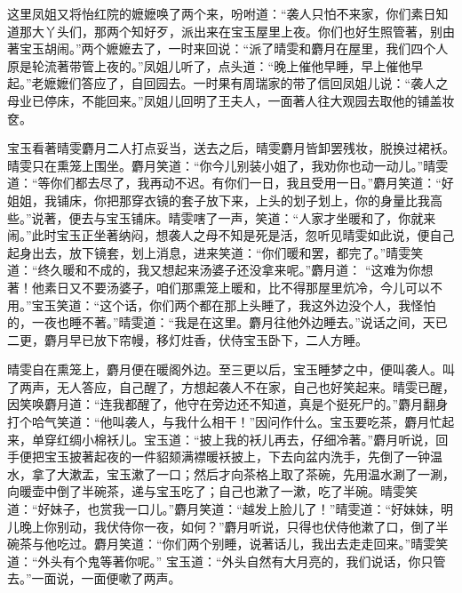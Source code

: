 \begin{parag}
    这里凤姐又将怡红院的嬷嬷唤了两个来，吩咐道：“袭人只怕不来家，你们素日知道那大丫头们，那两个知好歹，派出来在宝玉屋里上夜。你们也好生照管著，别由著宝玉胡闹。”两个嬷嬷去了，一时来回说：“派了晴雯和麝月在屋里，我们四个人原是轮流著带管上夜的。”凤姐儿听了，点头道：“晚上催他早睡，早上催他早起。”老嬷嬷们答应了，自回园去。一时果有周瑞家的带了信回凤姐儿说：“袭人之母业已停床，不能回来。”凤姐儿回明了王夫人，一面著人往大观园去取他的铺盖妆奁。
\end{parag}


\begin{parag}
    宝玉看著晴雯麝月二人打点妥当，送去之后，晴雯麝月皆卸罢残妆，脱换过裙袄。晴雯只在熏笼上围坐。麝月笑道：“你今儿别装小姐了，我劝你也动一动儿。”晴雯道：“等你们都去尽了，我再动不迟。有你们一日，我且受用一日。”麝月笑道：“好姐姐，我铺床，你把那穿衣镜的套子放下来，上头的划子划上，你的身量比我高些。”说著，便去与宝玉铺床。晴雯嗐了一声，笑道：“人家才坐暖和了，你就来闹。”此时宝玉正坐著纳闷，想袭人之母不知是死是活，忽听见晴雯如此说，便自己起身出去，放下镜套，划上消息，进来笑道：“你们暖和罢，都完了。”晴雯笑道：“终久暖和不成的，我又想起来汤婆子还没拿来呢。”麝月道： “这难为你想著！他素日又不要汤婆子，咱们那熏笼上暖和，比不得那屋里炕冷，今儿可以不用。”宝玉笑道：“这个话，你们两个都在那上头睡了，我这外边没个人，我怪怕的，一夜也睡不著。”晴雯道：“我是在这里。麝月往他外边睡去。”说话之间，天已二更，麝月早已放下帘幔，移灯炷香，伏侍宝玉卧下，二人方睡。
\end{parag}


\begin{parag}
    晴雯自在熏笼上，麝月便在暖阁外边。至三更以后，宝玉睡梦之中，便叫袭人。叫了两声，无人答应，自己醒了，方想起袭人不在家，自己也好笑起来。晴雯已醒，因笑唤麝月道：“连我都醒了，他守在旁边还不知道，真是个挺死尸的。”麝月翻身打个哈气笑道：“他叫袭人，与我什么相干！”因问作什么。宝玉要吃茶，麝月忙起来，单穿红绸小棉袄儿。宝玉道：“披上我的袄儿再去，仔细冷著。”麝月听说，回手便把宝玉披著起夜的一件貂颏满襟暖袄披上，下去向盆内洗手，先倒了一钟温水，拿了大漱盂，宝玉漱了一口；然后才向茶格上取了茶碗，先用温水涮了一涮，向暖壶中倒了半碗茶，递与宝玉吃了；自己也漱了一漱，吃了半碗。晴雯笑道：“好妹子，也赏我一口儿。”麝月笑道：“越发上脸儿了！”晴雯道：“好妹妹，明儿晚上你别动，我伏侍你一夜，如何？”麝月听说，只得也伏侍他漱了口，倒了半碗茶与他吃过。麝月笑道：“你们两个别睡，说著话儿，我出去走走回来。”晴雯笑道：“外头有个鬼等著你呢。” 宝玉道：“外头自然有大月亮的，我们说话，你只管去。”一面说，一面便嗽了两声。
\end{parag}


